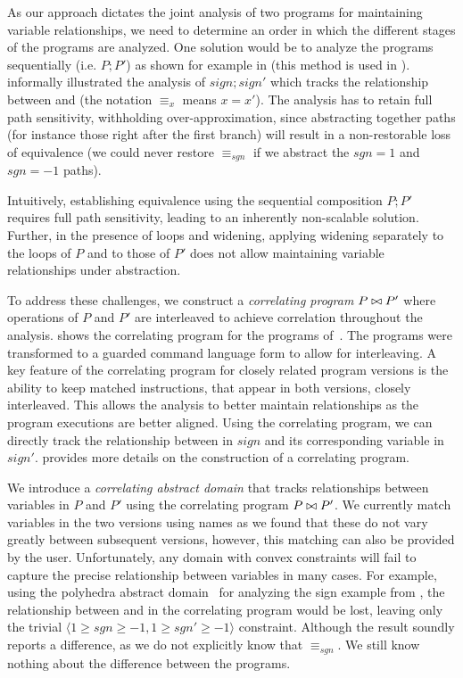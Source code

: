  As our approach dictates the joint analysis of two programs for maintaining variable relationships, we need to determine an order in which the different stages of the programs are analyzed. One solution would be to analyze the programs sequentially (i.e. $P;P'$) as shown for example in  (this method is used in \cite{EnglerRamos11,GodlinStrichman09}).  informally illustrated the analysis of $sign;sign'$ which tracks the relationship between  and  (the notation $\equiv_{x}$ means $x=x'$). The analysis has to retain full path sensitivity, withholding over-approximation, since abstracting together paths (for instance those right after the first branch) will result in a non-restorable loss of equivalence (we could never restore $\equiv_{sgn}$ if we abstract the $sgn=1$ and $sgn=-1$ paths).

Intuitively, establishing equivalence using the sequential composition $P;P'$ requires full path sensitivity, leading to an inherently non-scalable solution. Further, in the presence of loops and widening, applying widening separately to the loops of $P$ and to those of $P'$ does not allow maintaining variable relationships under abstraction.

To address these challenges, we construct a \emph{correlating program} $P \bowtie P'$ where operations of $P$ and $P'$ are interleaved to achieve correlation throughout the analysis.  shows the correlating program for the programs of~. The programs were transformed to a guarded command language form to allow for interleaving. A key feature of the correlating program for closely related program versions is the ability to keep matched instructions, that appear in both versions, closely interleaved. This allows the analysis to better maintain relationships as the program executions are better aligned. Using the correlating program, we can directly track the relationship between  in $sign$ and its corresponding variable  in $sign'$.  provides more details on the construction of a correlating program.

We introduce a \emph{correlating abstract domain} that tracks relationships between variables in $P$ and $P'$ using the correlating program $P \bowtie P'$. We currently match variables in the two versions using names as we found that these do not vary greatly between subsequent versions, however, this matching can also be provided by the user. Unfortunately, any domain with convex constraints will fail to capture the precise relationship between variables in many cases. For example, using the polyhedra abstract domain~\cite{CousotHalbwachs78} for analyzing the sign example from , the relationship between  and  in the correlating program would be lost, leaving only the trivial $\langle 1 \geq sgn \geq -1, 1 \geq sgn' \geq -1 \rangle$ constraint. Although the result soundly reports a difference, as we do not explicitly know that $\equiv_{sgn}$. We still know nothing about the difference between the programs.

